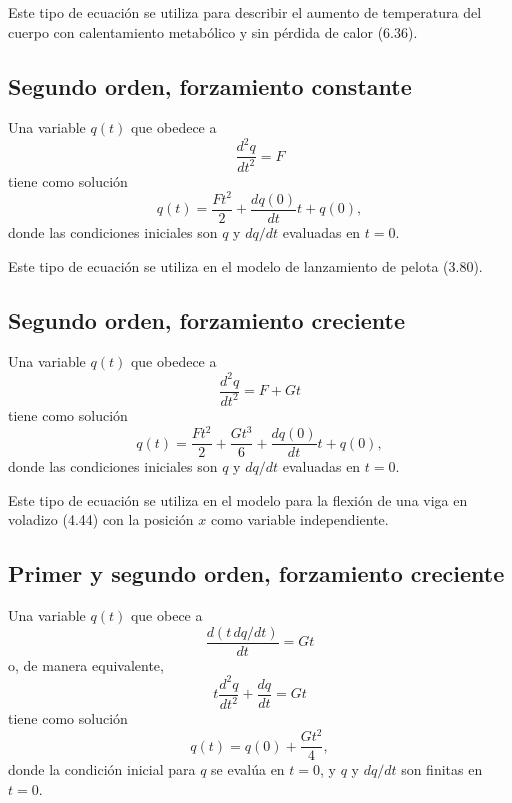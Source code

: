 \documentclass[12pt,a4paper]{book}
\begin{document}
Este tipo de ecuación se utiliza para describir el aumento de temperatura del cuerpo con calentamiento metabólico y sin pérdida de calor (6.36).

\subsection*{Segundo orden, forzamiento constante}

Una variable $q(t)$ que obedece a
\begin{equation}
\frac{d^2q}{dt^2} = F
\label{eq:C.3}
\end{equation}
tiene como solución
\begin{equation}
q(t) = \frac{Ft^2}{2} + \frac{dq(0)}{dt} t + q(0),
\label{eq:C.4}
\end{equation}
donde las condiciones iniciales son $q$ y $dq/dt$ evaluadas en $t = 0$.

Este tipo de ecuación se utiliza en el modelo de lanzamiento de pelota (3.80).

\subsection*{Segundo orden, forzamiento creciente}

Una variable $q(t)$ que obedece a
\begin{equation}
\frac{d^2q}{dt^2} = F + Gt
\label{eq:C.5}
\end{equation}
tiene como solución
\begin{equation}
q(t) = \frac{Ft^2}{2} + \frac{Gt^3}{6} + \frac{dq(0)}{dt} t + q(0),
\label{eq:C.6}
\end{equation}
donde las condiciones iniciales son $q$ y $dq/dt$ evaluadas en $t = 0$.

Este tipo de ecuación se utiliza en el modelo para la flexión de una viga en voladizo (4.44) con la posición $x$ como variable independiente.

\subsection*{Primer y segundo orden, forzamiento creciente}

Una variable $q(t)$ que obece a
\begin{equation}
\frac{d(t \, dq/dt)}{dt} = Gt
\label{eq:C.7}
\end{equation}
o, de manera equivalente,
\begin{equation}
t \frac{d^2q}{dt^2} + \frac{dq}{dt} = Gt
\label{eq:C.8}
\end{equation}
tiene como solución
\begin{equation}
q(t) = q(0) + \frac{Gt^2}{4},
\label{eq:C.9}
\end{equation}
donde la condición inicial para $q$ se evalúa en $t = 0$, y $q$ y $dq/dt$ son finitas en $t = 0$.
\end{document}
